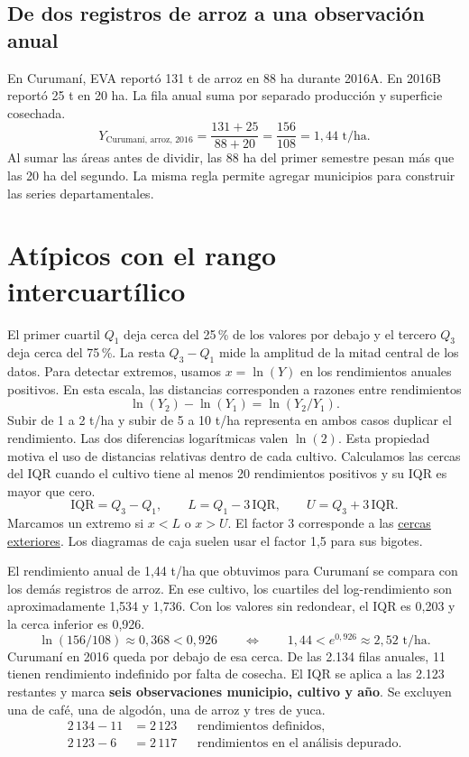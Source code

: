 \documentclass[11pt,a4paper]{article}
\begin{document}
\subsection*{De dos registros de arroz a una observación anual}
En Curumaní, EVA reportó 131 t de arroz en 88 ha durante 2016A. En 2016B
reportó 25 t en 20 ha. La fila anual suma por separado producción y superficie cosechada.
\[
Y_{\text{Curumaní, arroz, 2016}}
=\frac{131+25}{88+20}
=\frac{156}{108}
=1{,}44\text{ t/ha}.
\]
Al sumar las áreas antes de dividir, las 88 ha del primer semestre pesan más que las 20 ha
del segundo. La misma regla permite agregar municipios para construir las series departamentales.

\section{Atípicos con el rango intercuartílico}

El primer cuartil \(Q_1\) deja cerca del 25\,\% de los valores por debajo y el tercero \(Q_3\)
deja cerca del 75\,\%. La resta \(Q_3-Q_1\) mide la amplitud de la mitad central de los datos.
Para detectar extremos, usamos \(x=\ln(Y)\) en los rendimientos anuales positivos. En esta
escala, las distancias corresponden a razones entre rendimientos
\[
\ln(Y_2)-\ln(Y_1)=\ln(Y_2/Y_1).
\]
Subir de 1 a 2 t/ha y subir de 5 a 10 t/ha representa en ambos casos duplicar el
rendimiento. Las dos diferencias logarítmicas valen \(\ln(2)\). Esta propiedad motiva
el uso de distancias relativas dentro de cada cultivo. Calculamos las cercas del IQR
cuando el cultivo tiene al menos 20 rendimientos positivos y su IQR es mayor que cero.
\[
\mathrm{IQR}=Q_3-Q_1,\qquad
L=Q_1-3\,\mathrm{IQR},\qquad U=Q_3+3\,\mathrm{IQR}.
\]
Marcamos un extremo si \(x<L\) o \(x>U\). El factor 3 corresponde a las
\href{https://itl.nist.gov/div898/handbook/prc/section1/prc16.htm}{cercas exteriores}.
Los diagramas de caja suelen usar el factor 1,5 para sus bigotes.

El rendimiento anual de 1,44 t/ha que obtuvimos para Curumaní se compara con los demás registros de arroz.
En ese cultivo, los cuartiles del log-rendimiento son aproximadamente 1,534 y 1,736.
Con los valores sin redondear, el IQR es 0,203 y la cerca inferior es 0,926.
\[
\ln(156/108)\approx0{,}368 < 0{,}926
\qquad\Longleftrightarrow\qquad
1{,}44 < e^{0{,}926}\approx 2{,}52\text{ t/ha}.
\]
Curumaní en 2016 queda por debajo de esa cerca. De las 2.134 filas anuales, 11 tienen
rendimiento indefinido por falta de cosecha. El IQR se aplica a las 2.123 restantes
y marca \textbf{seis observaciones municipio, cultivo y año}. Se excluyen una de café,
una de algodón, una de arroz y tres de yuca.
\[
\begin{aligned}
2\,134-11 &= 2\,123 && \text{rendimientos definidos},\\
2\,123-6 &= 2\,117 && \text{rendimientos en el análisis depurado}.
\end{aligned}
\]
\end{document}
